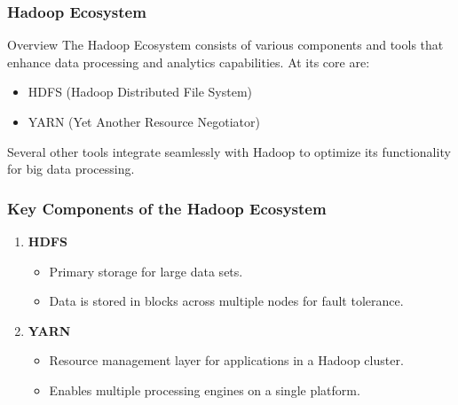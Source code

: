 \documentclass{beamer}
\begin{document}
\begin{frame}
    \frametitle{Hadoop Ecosystem}
    \begin{block}{Overview}
        The Hadoop Ecosystem consists of various components and tools that enhance data processing and analytics capabilities. At its core are:
        \begin{itemize}
            \item HDFS (Hadoop Distributed File System)
            \item YARN (Yet Another Resource Negotiator)
        \end{itemize}
        Several other tools integrate seamlessly with Hadoop to optimize its functionality for big data processing.
    \end{block}
\end{frame}

\begin{frame}[fragile]
    \frametitle{Key Components of the Hadoop Ecosystem}
    \begin{enumerate}
        \item \textbf{HDFS}
            \begin{itemize}
                \item Primary storage for large data sets.
                \item Data is stored in blocks across multiple nodes for fault tolerance.
            \end{itemize}
        \item \textbf{YARN}
            \begin{itemize}
                \item Resource management layer for applications in a Hadoop cluster.
                \item Enables multiple processing engines on a single platform.
            \end{itemize}
    \end{enumerate}
\end{frame}
\end{document}
